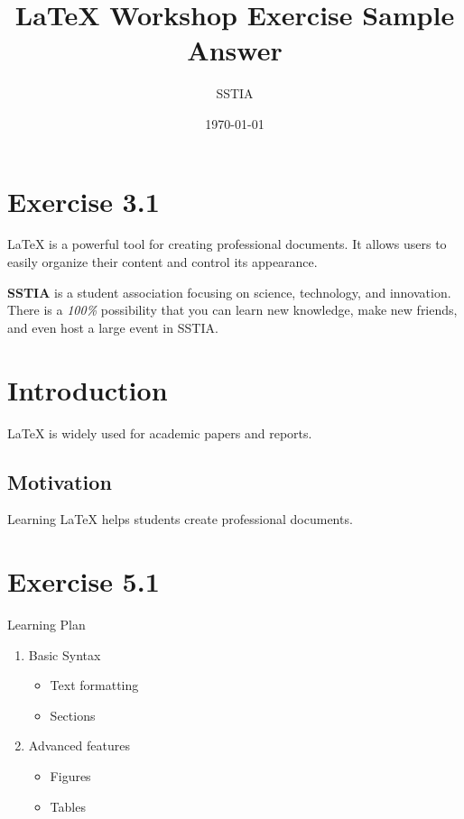 \documentclass{article}
\title{LaTeX Workshop Exercise Sample Answer}
\author{SSTIA}
\date{\today}
\begin{document}
\maketitle

\tableofcontents %


\section{Exercise 3.1}

LaTeX is a powerful tool for creating professional documents.
It allows users to easily organize their content and control its appearance.

\textbf{SSTIA} is a student association focusing on science, technology, and innovation.
There is a \textit{100\%} possibility that you can learn new knowledge, make new friends, and even host a large event in SSTIA.


\section{Introduction}
LaTeX is widely used for academic papers and reports.

\subsection{Motivation}
Learning LaTeX helps students create professional documents.


\section{Exercise 5.1 }

Learning Plan
\begin{enumerate}
    \item Basic Syntax
    \begin{itemize}
        \item Text formatting
        \item Sections
    \end{itemize}

    \item Advanced features
    \begin{itemize}
        \item Figures
        \item Tables
    \end{itemize}
\end{enumerate}
\end{document}
